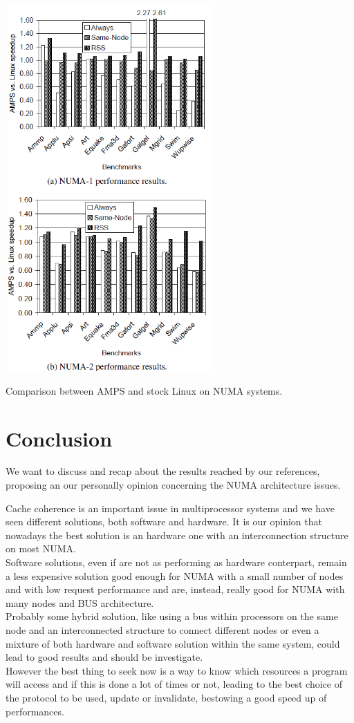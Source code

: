 \documentclass[a4paper,10pt]{article}
\makeatletter
\newenvironment{figurehere}{\def\@captype{figure}\vspace{2ex}}{\vspace{2ex}}
\makeatother
\begin{document}
\begin{multicols}{2}
\begin{figurehere}
 \centering
 \includegraphics[width=8cm, height=14cm]{./eps/amps.png}
 \caption{Comparison between AMPS and stock Linux on NUMA systems.}
 \label{fig:amps}
\end{figurehere}

\section{Conclusion}
We want to discuss and recap about the results reached by our references, proposing an our personally opinion concerning the NUMA architecture issues.

Cache coherence is an important issue in multiprocessor systems and we have seen different solutions, both software and hardware. It is our opinion that nowadays the best solution is an hardware one with an interconnection structure on most NUMA.\\
Software solutions, even if are not as performing as hardware conterpart, remain a less expensive solution good enough for NUMA with a small number of nodes and with low request performance and are, instead, really good for NUMA with many nodes and BUS architecture.\\
Probably some hybrid solution, like using a bus within processors on the same node and an interconnected structure to connect different nodes or even a mixture of both hardware and software solution within the same system, could lead to good results and should be investigate.\\
However the best thing to seek now is a way to know which resources a program will access and if this is done a lot of times or not, leading to the best choice of the protocol to be used, update or invalidate, bestowing a good speed up of performances.


\end{multicols}
\end{document}
